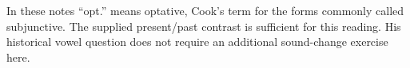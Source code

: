 In these notes “opt.” means optative, Cook’s term for the forms commonly called subjunctive. The supplied present/\allowbreak{}past contrast is sufficient for this reading. His historical vowel question does not require an additional sound-change exercise here.

\endgroup

\par\label{end-ch03-learner}
\clearpage\endgroup

